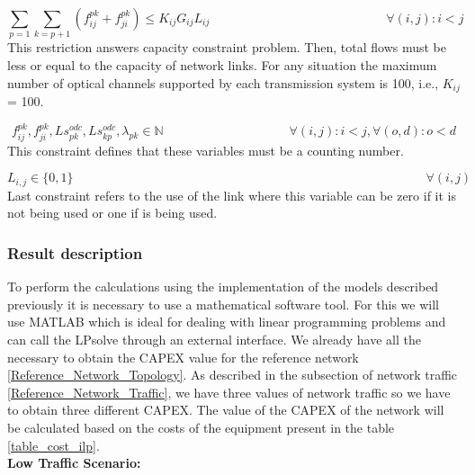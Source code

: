 \begin{equation}
\sum_{p=1} \sum_{k=p+1} \left( f_{ij}^{pk} + f_{ji}^{pk}\right) \leq K_{ij} G_{ij} L_{ij} \qquad \qquad \qquad \qquad \qquad \qquad \qquad
\forall (i,j) : i < j
\label{ILPTranslucp9}
\end{equation}
\noindent
This restriction answers capacity constraint problem. Then, total flows must be less or equal to the capacity of network links. For any situation the maximum number of optical channels supported by each transmission system is 100, i.e., $K_{ij}$ = 100.

\begin{equation}
f_{ij}^{pk} , f_{ji}^{pk} , Ls_{pk}^{odc} , Ls_{kp}^{odc} , \lambda_{pk} \in \mathbb{N}   \qquad \qquad \qquad \qquad \qquad
\forall(i,j) : i < j, \forall(o,d) : o < d
\label{ILPTranslucp10}
\end{equation}
\noindent
This constraint defines that these variables must be a counting number.

\begin{equation}
L_{i,j} \in \{0,1\} \qquad \qquad \qquad \qquad \qquad \qquad \qquad \qquad \qquad \qquad \qquad \qquad \qquad \qquad
\forall(i,j)
\label{ILPTransluc11}
\end{equation}
\noindent
Last constraint refers to the use of the link where this variable can be zero if it is not being used or one if is being used.

\vspace{18pt}
\subsubsection{Result description}

To perform the calculations using the implementation of the models described previously it is necessary to use a mathematical software tool. For this we will use MATLAB which is ideal for dealing with linear programming problems and can call the LPsolve through an external interface.
We already have all the necessary to obtain the CAPEX value for the reference network \ref{Reference_Network_Topology}. As described in the subsection of network traffic \ref{Reference_Network_Traffic}, we have three values of network traffic so we have to obtain three different CAPEX. The value of the CAPEX of the network will be calculated based on the costs of the equipment present in the table \ref{table_cost_ilp}.\\

\textbf{Low Traffic Scenario:}\\

